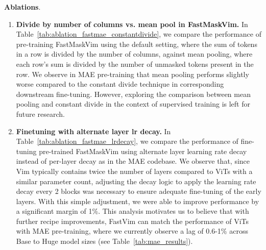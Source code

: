 \noindent \textbf{Ablations}.


\begin{enumerate}
    

\item \textbf{Divide by number of columns vs. mean pool in FastMaskVim.} In Table~\ref{tab:ablation_fastmae_constantdivide}, we compare the performance of pre-training FastMaskVim using the default setting, where the sum of tokens in a row is divided by the number of columns, against mean pooling, where each row's sum is divided by the number of unmasked tokens present in the row. We observe in MAE pre-training that mean pooling performs slightly worse compared to the constant divide technique in corresponding downstream fine-tuning. However, exploring the comparison between mean pooling and constant divide in the context of supervised training is left for future research.

\begin{table}[!h]
    \caption{Comparison of constant divide vs. mean pool in pre-training FastMaskVim} 
    \begin{center}
\end{center}
    \label{tab:ablation_fastmae_constantdivide}
\end{table}

\item \textbf{Finetuning with alternate layer lr decay.} In Table~\ref{tab:ablation_fastmae_lrdecay}, we compare the performance of fine-tuning pre-trained FastMaskVim using alternate layer learning rate decay instead of per-layer decay as in the MAE codebase. We observe that, since Vim typically contains twice the number of layers compared to ViTs with a similar parameter count, adjusting the decay logic to apply the learning rate decay every 2 blocks was necessary to ensure adequate fine-tuning of the early layers. With this simple adjustment, we were able to improve performance by a significant margin of 1\%. This analysis motivates us to believe that with further recipe improvements, FastVim can match the performance of ViTs with MAE pre-training, where we currently observe a lag of 0.6-1\% across Base to Huge model sizes (see Table~\ref{tab:mae_results}).


\end{enumerate}
